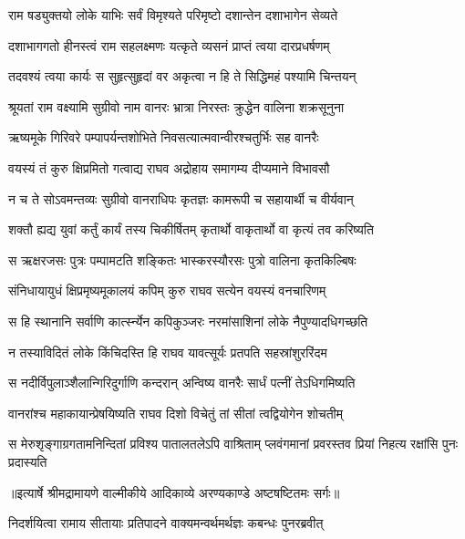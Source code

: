 \twolineshloka
{राम षड्युक्तयो लोके याभिः सर्वं विमृश्यते}
{परिमृष्टो दशान्तेन दशाभागेन सेव्यते} %

\twolineshloka
{दशाभागगतो हीनस्त्वं राम सहलक्ष्मणः}
{यत्कृते व्यसनं प्राप्तं त्वया दारप्रधर्षणम्} %

\twolineshloka
{तदवश्यं त्वया कार्यः स सुहृत्सुहृदां वर}
{अकृत्वा न हि ते सिद्धिमहं पश्यामि चिन्तयन्} %

\twolineshloka
{श्रूयतां राम वक्ष्यामि सुग्रीवो नाम वानरः}
{भ्रात्रा निरस्तः क्रुद्धेन वालिना शक्रसूनुना} %

\twolineshloka
{ऋष्यमूके गिरिवरे पम्पापर्यन्तशोभिते}
{निवसत्यात्मवान्वीरश्चतुर्भिः सह वानरैः} %

\twolineshloka
{वयस्यं तं कुरु क्षिप्रमितो गत्वाद्य राघव}
{अद्रोहाय समागम्य दीप्यमाने विभावसौ} %

\twolineshloka
{न च ते सोऽवमन्तव्यः सुग्रीवो वानराधिपः}
{कृतज्ञः कामरूपी च सहायार्थी च वीर्यवान्} %

\twolineshloka
{शक्तौ ह्यद्य युवां कर्तुं कार्यं तस्य चिकीर्षितम्}
{कृतार्थो वाकृतार्थो वा कृत्यं तव करिष्यति} %

\twolineshloka
{स ऋक्षरजसः पुत्रः पम्पामटति शङ्कितः}
{भास्करस्यौरसः पुत्रो वालिना कृतकिल्बिषः} %

\twolineshloka
{संनिधायायुधं क्षिप्रमृष्यमूकालयं कपिम्}
{कुरु राघव सत्येन वयस्यं वनचारिणम्} %

\twolineshloka
{स हि स्थानानि सर्वाणि कार्त्स्न्येन कपिकुञ्जरः}
{नरमांसाशिनां लोके नैपुण्यादधिगच्छति} %

\twolineshloka
{न तस्याविदितं लोके किंचिदस्ति हि राघव}
{यावत्सूर्यः प्रतपति सहस्रांशुररिंदम} %

\twolineshloka
{स नदीर्विपुलाञ्शैलान्गिरिदुर्गाणि कन्दरान्}
{अन्विष्य वानरैः सार्धं पत्नीं तेऽधिगमिष्यति} %

\twolineshloka
{वानरांश्च महाकायान्प्रेषयिष्यति राघव}
{दिशो विचेतुं तां सीतां त्वद्वियोगेन शोचतीम्} %

\fourlineindentedshloka
{स मेरुशृङ्गाग्रगतामनिन्दितां}
{ प्रविश्य पातालतलेऽपि वाश्रिताम्}
{प्लवंगमानां प्रवरस्तव प्रियां}
{ निहत्य रक्षांसि पुनः प्रदास्यति} %


{॥इत्यार्षे श्रीमद्रामायणे वाल्मीकीये आदिकाव्ये अरण्यकाण्डे अष्टषष्टितमः सर्गः॥}


\twolineshloka
{निदर्शयित्वा रामाय सीतायाः प्रतिपादने}
{वाक्यमन्वर्थमर्थज्ञः कबन्धः पुनरब्रवीत्} %

